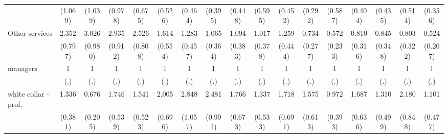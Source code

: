 {\begin{tabular}{l*{16}{c}}
                    &     (1.069)         &     (1.039)         &     (0.978)         &     (0.675)         &     (0.526)         &     (0.464)         &     (0.395)         &     (0.448)         &     (0.595)         &     (0.452)         &     (0.292)         &     (0.587)         &     (0.404)         &     (0.435)         &     (0.514)         &     (0.356)         \\
[1em]
Other services      &       2.352\sym{*}  &       3.026\sym{***}&       2.935\sym{***}&       2.526\sym{**} &       1.614         &       1.283         &       1.065         &       1.094         &       1.017         &       1.259         &       0.734         &       0.572         &       0.810         &       0.845         &       0.803         &       0.524         \\
                    &     (0.797)         &     (0.980)         &     (0.912)         &     (0.808)         &     (0.554)         &     (0.457)         &     (0.364)         &     (0.383)         &     (0.378)         &     (0.444)         &     (0.277)         &     (0.233)         &     (0.316)         &     (0.348)         &     (0.322)         &     (0.207)         \\
[1em]
managers            &           1         &           1         &           1         &           1         &           1         &           1         &           1         &           1         &           1         &           1         &           1         &           1         &           1         &           1         &           1         &           1         \\
                    &         (.)         &         (.)         &         (.)         &         (.)         &         (.)         &         (.)         &         (.)         &         (.)         &         (.)         &         (.)         &         (.)         &         (.)         &         (.)         &         (.)         &         (.)         &         (.)         \\
[1em]
white collar - prof.&       1.336         &       0.676         &       1.746         &       1.541         &       2.005\sym{*}  &       2.848\sym{**} &       2.481\sym{*}  &       1.766         &       1.337         &       1.718         &       1.575         &       0.972         &       1.687         &       1.310         &       2.180\sym{*}  &       1.101         \\
                    &     (0.381)         &     (0.205)         &     (0.539)         &     (0.523)         &     (0.696)         &     (1.057)         &     (0.991)         &     (0.673)         &     (0.533)         &     (0.691)         &     (0.613)         &     (0.393)         &     (0.636)         &     (0.499)         &     (0.848)         &     (0.477)         \\

\end{tabular}}
